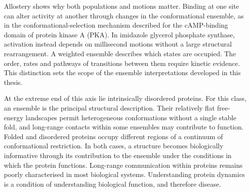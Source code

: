 Allostery shows why both populations and motions matter. Binding at one site can alter activity at another through changes in the conformational ensemble, as in the conformational-selection mechanism described for the cAMP-binding domain of protein kinase A (PKA).\supercite{lisiAllosteryEnzymeCatalysis2017} In imidazole glycerol phosphate synthase, activation instead depends on millisecond motions without a large structural rearrangement.\supercite{lisiAllosteryEnzymeCatalysis2017} A weighted ensemble describes which states are occupied. The order, rates and pathways of transitions between them require kinetic evidence. This distinction sets the scope of the ensemble interpretations developed in this thesis.

At the extreme end of this axis lie intrinsically disordered proteins. For this class, an ensemble is the principal structural description. Their relatively flat free-energy landscapes permit heterogeneous conformations without a single stable fold, and long-range contacts within some ensembles may contribute to function.\supercite{fisherConstructingEnsemblesIntrinsically2011} Folded and disordered proteins occupy different regions of a continuum of conformational restriction.\supercite{galpernInformationtheoreticArgumentRestriction2026} In both cases, a structure becomes biologically informative through its contribution to the ensemble under the conditions in which the protein functions. Long-range communication within proteins remains poorly characterised in most biological systems.\supercite{lisiAllosteryEnzymeCatalysis2017} Understanding protein dynamics is a condition of understanding biological function, and therefore disease.


